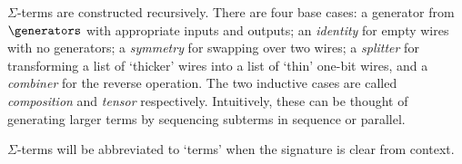 \(\Sigma\)-terms are constructed recursively.
There are four base cases: a generator from \(\generators\) with appropriate
inputs and outputs;
an \emph{identity} for empty wires with no generators;
a \emph{symmetry} for swapping over two wires;
a \emph{splitter} for transforming a list of `thicker' wires into a list of
`thin' one-bit wires, and a \emph{combiner} for the reverse operation.
The two inductive cases are called \emph{composition} and \emph{tensor}
respectively.
Intuitively, these can be thought of generating larger terms by sequencing
subterms in sequence or parallel.

\(\Sigma\)-terms will be abbreviated to `terms' when the signature is clear from
context.